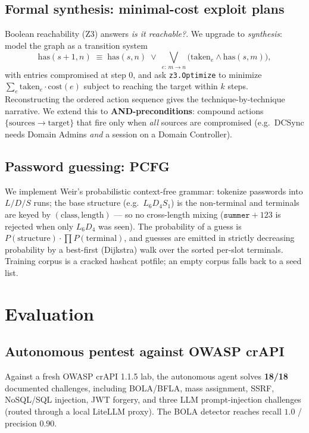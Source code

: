 \documentclass[11pt]{article}
\begin{document}
\subsection{Formal synthesis: minimal-cost exploit plans}
Boolean reachability (Z3) answers \emph{is it reachable?}. We upgrade to
\emph{synthesis}: model the graph as a transition system
\[
\mathrm{has}(s{+}1, n) \;\equiv\; \mathrm{has}(s,n)
   \;\vee\; \bigvee_{e:\, m\to n} \bigl(\mathrm{taken}_e \wedge \mathrm{has}(s,m)\bigr),
\]
with entries compromised at step $0$, and ask \texttt{z3.Optimize} to minimize
$\sum_e \mathrm{taken}_e \cdot \mathrm{cost}(e)$ subject to reaching the target
within $k$ steps. Reconstructing the ordered action sequence gives the
technique-by-technique narrative. We extend this to \textbf{AND-preconditions}:
compound actions $\{\mathrm{sources}\to \mathrm{target}\}$ that fire only when
\emph{all} sources are compromised (e.g.\ DCSync needs Domain Admins \emph{and} a
session on a Domain Controller).

\subsection{Password guessing: PCFG}
We implement Weir's probabilistic context-free grammar: tokenize passwords into
$L/D/S$ runs; the base structure (e.g.\ $L_6D_4S_1$) is the non-terminal and
terminals are keyed by $(\text{class},\text{length})$ --- so no cross-length
mixing ($\texttt{summer}+123$ is rejected when only $L_6D_4$ was seen). The
probability of a guess is $P(\mathrm{structure})\cdot\prod P(\mathrm{terminal})$,
and guesses are emitted in strictly decreasing probability by a best-first
(Dijkstra) walk over the sorted per-slot terminals. Training corpus is a cracked
hashcat potfile; an empty corpus falls back to a seed list.

\section{Evaluation}
\subsection{Autonomous pentest against OWASP crAPI}
Against a fresh OWASP crAPI 1.1.5 lab, the autonomous agent solves \textbf{18/18}
documented challenges, including BOLA/BFLA, mass assignment, SSRF, NoSQL/SQL
injection, JWT forgery, and three LLM prompt-injection challenges (routed through
a local LiteLLM proxy). The BOLA detector reaches recall $1.0$ / precision $0.90$.
\end{document}
